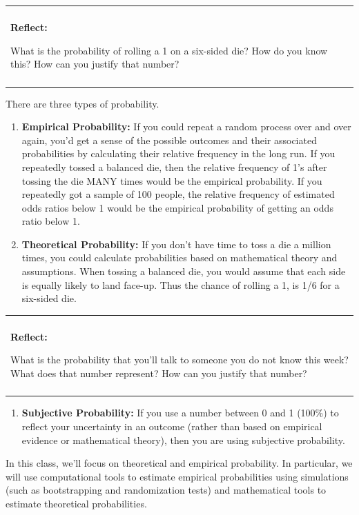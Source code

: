 \documentclass[]{book}
\providecommand{\tightlist}{%
  \setlength{\itemsep}{0pt}\setlength{\parskip}{0pt}}
\newenvironment{reflect}
{
    \begin{center}
    
    \begin{tabular}{|p{0.8\textwidth}|}
    \rowcolor{LightBlue}
    \hline\\
    \rowcolor{LightBlue}
    \textbf{Reflect:}
}
{
    \\\rowcolor{LightBlue}
    \\\hline
    \end{tabular} 
    \end{center}
}
\begin{document}
\begin{reflect}
What is the probability of rolling a 1 on a six-sided die? How do you
know this? How can you justify that number?
\end{reflect}

There are three types of probability.

\begin{enumerate}
\def\labelenumi{\arabic{enumi}.}
\item
  \textbf{Empirical Probability:} If you could repeat a random process over and over again, you'd get a sense of the possible outcomes and their associated probabilities by calculating their relative frequency in the long run. If you repeatedly tossed a balanced die, then the relative frequency of 1's after tossing the die MANY times would be the empirical probability. If you repeatedly got a sample of 100 people, the relative frequency of estimated odds ratios below 1 would be the empirical probability of getting an odds ratio below 1.
\item
  \textbf{Theoretical Probability:} If you don't have time to toss a die a million times, you could calculate probabilities based on mathematical theory and assumptions. When tossing a balanced die, you would assume that each side is equally likely to land face-up. Thus the chance of rolling a 1, is 1/6 for a six-sided die.
\end{enumerate}

\begin{reflect}
What is the probability that you'll talk to someone you do not know this
week? What does that number represent? How can you justify that number?
\end{reflect}

\begin{enumerate}
\def\labelenumi{\arabic{enumi}.}
\setcounter{enumi}{2}
\tightlist
\item
  \textbf{Subjective Probability:} If you use a number between 0 and 1 (100\%) to reflect your uncertainty in an outcome (rather than based on empirical evidence or mathematical theory), then you are using subjective probability.
\end{enumerate}

In this class, we'll focus on theoretical and empirical probability. In particular, we will use computational tools to estimate empirical probabilities using simulations (such as bootstrapping and randomization tests) and mathematical tools to estimate theoretical probabilities.
\end{document}
